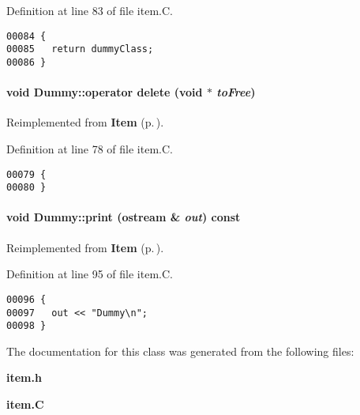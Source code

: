 Definition at line 83 of file item.C.\small\begin{verbatim}00084 {
00085   return dummyClass; 
00086 }
\end{verbatim}\normalsize 
\label{Dummy_a6}
\paragraph{\setlength{\rightskip}{0pt plus 5cm}void Dummy::operator delete (void $\ast$ {\em to\-Free})}\hfill



Reimplemented from {\bf Item} {\rm (p.\,\pageref{Item_a7})}.

Definition at line 78 of file item.C.\small\begin{verbatim}00079 {
00080 }
\end{verbatim}\normalsize 
\label{Dummy_a5}
\paragraph{\setlength{\rightskip}{0pt plus 5cm}void Dummy::print (ostream \& {\em out}) const\hspace{0.3cm}{\tt  [virtual]}}\hfill



Reimplemented from {\bf Item} {\rm (p.\,\pageref{Item_a8})}.

Definition at line 95 of file item.C.\small\begin{verbatim}00096 {
00097   out << "Dummy\n";
00098 }
\end{verbatim}\normalsize 


The documentation for this class was generated from the following files:\begin{CompactItemize}
\item 
{\bf item.h}\item 
{\bf item.C}\end{CompactItemize}
